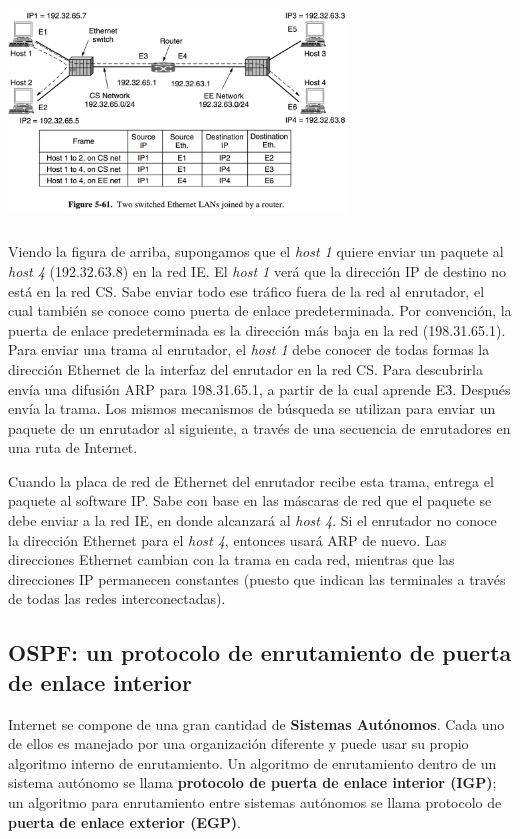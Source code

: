 		\begin{center}
			\includegraphics[width=9cm, height=6cm]{./imagenes/arp.png} 
		\end{center}

	\par Viendo la figura de arriba, supongamos que el \textit{host 1} quiere enviar un paquete al \textit{host 4} (192.32.63.8) en la red IE. El \textit{host 1} verá que la dirección IP de destino no está en la red CS. Sabe enviar todo ese tráfico fuera de la red al enrutador, el cual también se conoce como puerta de enlace predeterminada. Por convención, la puerta de enlace predeterminada es la dirección más baja en la red (198.31.65.1). Para enviar una trama al enrutador, el \textit{host 1} debe conocer de todas formas la dirección Ethernet de la interfaz del enrutador en la red CS. Para descubrirla envía una difusión ARP para 198.31.65.1, a partir de la cual aprende E3. Después envía la trama. Los mismos mecanismos de búsqueda se utilizan para enviar un paquete de un enrutador al siguiente, a través de una secuencia de enrutadores en una ruta de Internet.
	
	\par Cuando la placa de red de Ethernet del enrutador recibe esta trama, entrega el paquete al software IP. Sabe con base en las máscaras de red que el paquete se debe enviar a la red IE, en donde alcanzará al \textit{host 4}. Si el enrutador no conoce la dirección Ethernet para el \textit{host 4}, entonces usará ARP de nuevo. Las direcciones Ethernet cambian con la trama en cada red, mientras que las direcciones IP permanecen constantes (puesto que indican las terminales a través de todas las redes interconectadas).
	
\subsection{OSPF: un protocolo de enrutamiento de puerta de enlace interior}
	\par Internet se compone de una gran cantidad de \textbf{Sistemas Autónomos}. Cada uno de ellos es manejado por una organización diferente y puede usar su propio algoritmo interno de enrutamiento. Un algoritmo de enrutamiento dentro de un sistema autónomo se llama \textbf{protocolo de puerta de enlace interior (IGP)}; un algoritmo para enrutamiento entre sistemas autónomos se llama protocolo de \textbf{puerta de enlace exterior (EGP)}.

